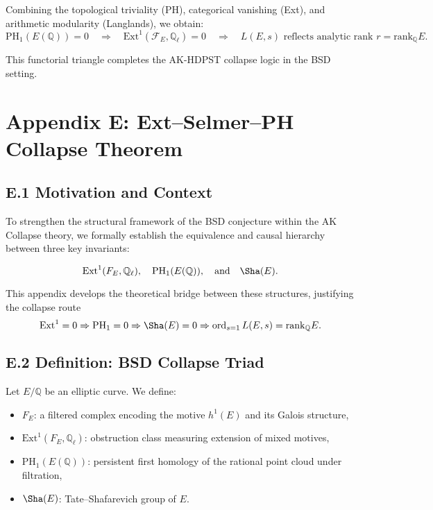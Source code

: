 Combining the topological triviality (PH), categorical vanishing (Ext), and arithmetic modularity (Langlands), we obtain:
\[
\mathrm{PH}_1(E(\mathbb{Q})) = 0
\quad \Rightarrow \quad
\mathrm{Ext}^1(\mathcal{F}_E, \mathbb{Q}_\ell) = 0
\quad \Rightarrow \quad
L(E,s) \text{ reflects analytic rank } r = \mathrm{rank}_\mathbb{Q}E.
\]

This functorial triangle completes the AK-HDPST collapse logic in the BSD setting.



\section*{Appendix E: Ext--Selmer--PH Collapse Theorem}

\subsection*{E.1 Motivation and Context}

To strengthen the structural framework of the BSD conjecture within the AK Collapse theory,  
we formally establish the equivalence and causal hierarchy between three key invariants:

\[
\mathrm{Ext}^1(F_E, \mathbb{Q}_\ell), \quad \mathrm{PH}_1(E(\mathbb{Q})), \quad \text{and} \quad \Sha(E).
\]

This appendix develops the theoretical bridge between these structures, justifying the collapse route  
\[
\mathrm{Ext}^1 = 0 \Rightarrow \mathrm{PH}_1 = 0 \Rightarrow \Sha(E) = 0 \Rightarrow \operatorname{ord}_{s=1}L(E,s) = \mathrm{rank}_\mathbb{Q}E.
\]

\subsection*{E.2 Definition: BSD Collapse Triad}

Let \( E/\mathbb{Q} \) be an elliptic curve. We define:

\begin{itemize}
  \item \( F_E \): a filtered complex encoding the motive \( h^1(E) \) and its Galois structure,
  \item \( \mathrm{Ext}^1(F_E, \mathbb{Q}_\ell) \): obstruction class measuring extension of mixed motives,
  \item \( \mathrm{PH}_1(E(\mathbb{Q})) \): persistent first homology of the rational point cloud under filtration,
  \item \( \Sha(E) \): Tate--Shafarevich group of \( E \).
\end{itemize}


